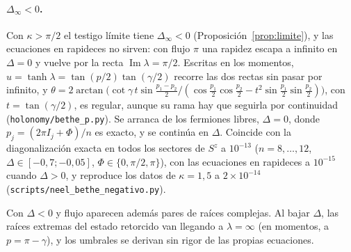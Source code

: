 \documentclass[11pt,a4paper]{article}
\theoremstyle{remark}
\begin{document}
\paragraph{$\Delta_\infty<0$.} Con $\kappa>\pi/2$ el testigo límite tiene $\Delta_\infty<0$
(Proposición~\ref{prop:limite}), y las ecuaciones en rapideces no sirven: con flujo $\pi$ una
rapidez escapa a infinito en $\Delta=0$ y vuelve por la recta $\operatorname{Im}\lambda=\pi/2$.
Escritas en los momentos, $u=\tanh\lambda=\tan(p/2)\tan(\gamma/2)$ recorre las dos rectas sin
pasar por infinito, y $\theta=2\arctan\big(\cot\gamma\,t\sin\tfrac{p_1-p_2}2/(\cos\tfrac{p_1}2\cos\tfrac{p_2}2
-t^2\sin\tfrac{p_1}2\sin\tfrac{p_2}2)\big)$, con $t=\tan(\gamma/2)$, es regular, aunque su rama hay que
seguirla por continuidad (\texttt{holonomy/bethe\_p.py}). Se arranca de los fermiones libres,
$\Delta=0$, donde $p_j=(2\pi I_j+\Phi)/n$ es exacto, y se continúa en $\Delta$. Coincide con la
diagonalización exacta en todos los sectores de $S^z$ a $10^{-13}$ ($n=8,\dots,12$,
$\Delta\in[-0{,}7;-0{,}05]$, $\Phi\in\{0,\pi/2,\pi\}$), con las ecuaciones en rapideces a
$10^{-15}$ cuando $\Delta>0$, y reproduce los datos de $\kappa=1{,}5$ a $2\times10^{-14}$
(\texttt{scripts/neel\_bethe\_negativo.py}).

Con $\Delta<0$ y flujo aparecen además pares de raíces complejas. Al bajar $\Delta$, las raíces
extremas del estado retorcido van llegando a $\lambda=\infty$ (en momentos, a $p=\pi-\gamma$), y los
umbrales se derivan sin rigor de las propias ecuaciones.
\end{document}
